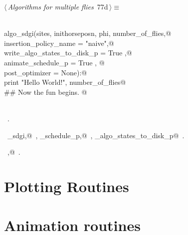 \documentclass[11.5pt]{report}
\begin{document}
\newchunk 
\begin{flushleft} \small\label{scrap112}\raggedright\small
{} $\langle\,${\itshape Algorithms for multiple flies}\nobreak\ {\footnotesize {77d}}$\,\rangle\equiv$
\vspace{-1ex}
\begin{list}{}{} \item
\mbox{}\verb@@\\
\mbox{}\verb@def algo_sdgi(sites, inithorseposn, phi, number_of_flies,@\\
\mbox{}\verb@              insertion_policy_name       = "naive",@\\
\mbox{}\verb@              write_algo_states_to_disk_p = True   ,@\\
\mbox{}\verb@              animate_schedule_p          = True   , @\\
\mbox{}\verb@              post_optimizer              = None):@\\
\mbox{}\verb@    print "Hello World!", number_of_flies@\\
\mbox{}\verb@    ## Now the fun begins. @\\
\mbox{}\verb@@\\
\mbox{}\verb@@{\NWsep}
\end{list}
\vspace{-1.5ex}
\footnotesize
\begin{list}{}{\setlength{\itemsep}{-\parsep}\setlength{\itemindent}{-\leftmargin}}
\item \NWtxtMacroRefIn\ .
\item \NWtxtIdentsDefed\nobreak\  \verb@algo_sdgi,@\nobreak\ , \verb@animate_schedule_p,@\nobreak\ \NWtxtIdentsNotUsed, \verb@write_algo_states_to_disk_p@\nobreak\ \NWtxtIdentsNotUsed.\item \NWtxtIdentsUsed\nobreak\  \verb@phi,@\nobreak\ .
\item{}
\end{list}
\vspace{4ex}
\end{flushleft}




\section{Plotting Routines}
\section{Animation routines}
\end{document}
